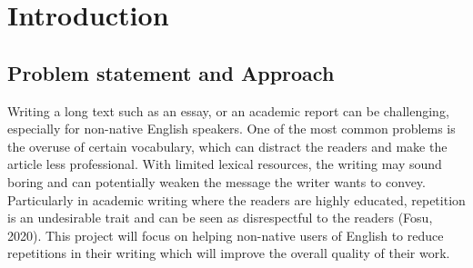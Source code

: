 \documentclass[12pt,oneside,openright,a4paper]{cpe-english-project}
\begin{document}




\chapter{Introduction}

\section{Problem statement and Approach} 

Writing a long text such as an essay, or an academic report can be challenging, especially for non-native English speakers. One of the most common problems is the overuse of certain vocabulary, which can distract the readers and make the article less professional. With limited lexical resources, the writing may sound boring and can potentially weaken the message the writer wants to convey. Particularly in academic writing where the readers are highly educated, repetition is an undesirable trait and can be seen as disrespectful to the readers (Fosu, 2020\cite{fosu20}). This project will focus on helping non-native users of English to reduce repetitions in their writing which will improve the overall quality of their work.
\end{document}

